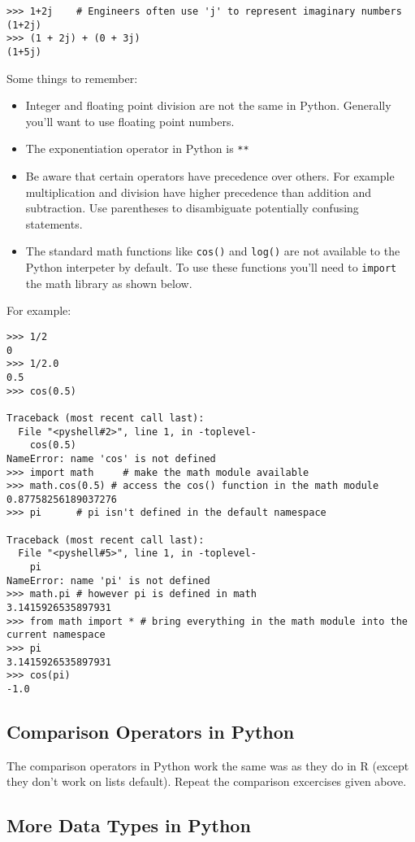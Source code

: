 \documentclass{article}
\begin{document}
\begin{lstlisting}
>>> 1+2j    # Engineers often use 'j' to represent imaginary numbers
(1+2j)
>>> (1 + 2j) + (0 + 3j)
(1+5j)
\end{lstlisting}
Some things to remember:

\begin{itemize}
\item
  Integer and floating point division are not the same in Python.
  Generally you'll want to use floating point numbers.
\item
  The exponentiation operator in Python is \lstinline!**!
\item
  Be aware that certain operators have precedence over others. For
  example multiplication and division have higher precedence than
  addition and subtraction. Use parentheses to disambiguate potentially
  confusing statements.
\item
  The standard math functions like \lstinline!cos()! and
  \lstinline!log()! are not available to the Python interpeter by
  default. To use these functions you'll need to \lstinline!import! the
  math library as shown below.
\end{itemize}
For example:

\begin{lstlisting}
>>> 1/2
0
>>> 1/2.0
0.5    
>>> cos(0.5)

Traceback (most recent call last):
  File "<pyshell#2>", line 1, in -toplevel-
    cos(0.5)
NameError: name 'cos' is not defined
>>> import math     # make the math module available
>>> math.cos(0.5) # access the cos() function in the math module
0.87758256189037276
>>> pi      # pi isn't defined in the default namespace

Traceback (most recent call last):
  File "<pyshell#5>", line 1, in -toplevel-
    pi
NameError: name 'pi' is not defined
>>> math.pi # however pi is defined in math
3.1415926535897931
>>> from math import * # bring everything in the math module into the current namespace
>>> pi
3.1415926535897931
>>> cos(pi)
-1.0
\end{lstlisting}
\subsection{Comparison Operators in Python}

The comparison operators in Python work the same was as they do in R
(except they don't work on lists default). Repeat the comparison
excercises given above.

\subsection{More Data Types in Python}
\end{document}
